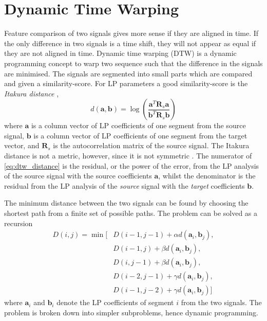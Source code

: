 \section{Dynamic Time Warping} %
\label{the:dynamic_time_warping}
Feature comparison of two signals gives more sense if they are aligned in time. If the only difference in two signals is a time shift, they will not appear as equal if they are not aligned in time. Dynamic time warping (DTW) is a dynamic programming concept to warp two sequence such that the difference in the signals are minimised. The signals are segmented into small parts which are compared and given a similarity-score. For LP parameters a good similarity-score is the \emph{Itakura distance} \cite{itakura90},
\begin{equation}
	\label{eq:dtw_distance}
		d(\mathbf{a},\mathbf{b}) = \log\left(\frac{\mathbf{a}^T \mathbf{R}_s \mathbf{a}}{\mathbf{b}^T \mathbf{R}_s \mathbf{b}}\right)	
\end{equation}
where $\mathbf{a}$ is a column vector of LP coefficients of one segment from the source signal, $\mathbf{b}$ is a column vector of LP coefficients of one segment from the target vector, and $\mathbf{R}_s$ is the autocorrelation matrix of the source signal. The Itakura distance is not a metric, however, since it is not symmetric \cite{kreyszig78}. The numerator of \eqref{eq:dtw_distance} is the residual, or the power of the error, from the LP analysis of the source signal with the source coefficients $\mathbf{a}$, whilst the denominator is the residual from the LP analysis of the \emph{source} signal with the \emph{target} coefficients $\mathbf{b}$. 

The minimum distance between the two signals can be found by choosing the shortest path from a finite set of possible paths. The problem can be solved as a recursion \cite{taletek}
\begin{equation}
	\label{eq:dtw_recursion}
	\begin{split}
		D(i,j) = \min \bigl[&D(i-1,j-1)+\alpha d(\mathbf{a}_i,\mathbf{b}_j),\\
		& D(i-1,j)+\beta d(\mathbf{a}_i,\mathbf{b}_j),\\
		& D(i,j-1)+\beta d(\mathbf{a}_i,\mathbf{b}_j),\\
		& D(i-2,j-1)+\gamma d(\mathbf{a}_i,\mathbf{b}_j),\\
		& D(i-1,j-2)+\gamma d(\mathbf{a}_i,\mathbf{b}_j)\bigr]		
	\end{split}
\end{equation}
where $\mathbf{a}_i$ and $\mathbf{b}_i$ denote the LP coefficients of segment $i$ from the two signals. 
The problem is broken down into simpler subproblems, hence dynamic programming. 

